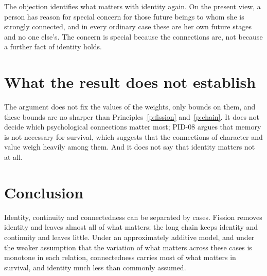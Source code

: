 \documentclass{situationist-preprint}
\begin{document}
\begin{reply}
The objection identifies what matters with identity again. On the present view, a person has reason for special concern for those future beings to whom she is strongly connected, and in every ordinary case these are her own future stages and no one else's. The concern is special because the connections are, not because a further fact of identity holds.
\end{reply}

\section{What the result does not establish}\label{s:not}

The argument does not fix the values of the weights, only bounds on them, and these bounds are no sharper than Principles~\ref{p:fission} and~\ref{p:chain}. It does not decide which psychological connections matter most; PID-08 argues that memory is not necessary for survival, which suggests that the connections of character and value weigh heavily among them. And it does not say that identity matters not at all.

\section{Conclusion}

Identity, continuity and connectedness can be separated by cases. Fission removes identity and leaves almost all of what matters; the long chain keeps identity and continuity and leaves little. Under an approximately additive model, and under the weaker assumption that the variation of what matters across these cases is monotone in each relation, connectedness carries most of what matters in survival, and identity much less than commonly assumed.
\end{document}
